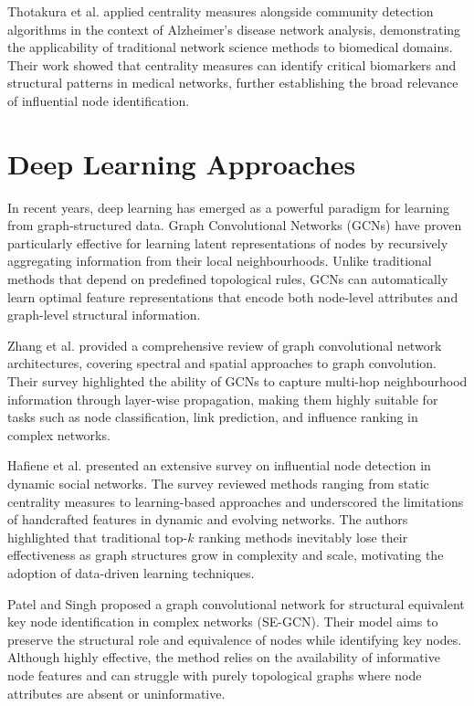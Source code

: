 Thotakura et al. \cite{thotakura2024} applied centrality measures alongside community detection algorithms in the context of Alzheimer's disease network analysis, demonstrating the applicability of traditional network science methods to biomedical domains. Their work showed that centrality measures can identify critical biomarkers and structural patterns in medical networks, further establishing the broad relevance of influential node identification.

\section{Deep Learning Approaches}

In recent years, deep learning has emerged as a powerful paradigm for learning from graph-structured data. Graph Convolutional Networks (GCNs) \cite{zhang2019gcn} have proven particularly effective for learning latent representations of nodes by recursively aggregating information from their local neighbourhoods. Unlike traditional methods that depend on predefined topological rules, GCNs can automatically learn optimal feature representations that encode both node-level attributes and graph-level structural information.

Zhang et al. \cite{zhang2019gcn} provided a comprehensive review of graph convolutional network architectures, covering spectral and spatial approaches to graph convolution. Their survey highlighted the ability of GCNs to capture multi-hop neighbourhood information through layer-wise propagation, making them highly suitable for tasks such as node classification, link prediction, and influence ranking in complex networks.

Hafiene et al. \cite{hafiene2020} presented an extensive survey on influential node detection in dynamic social networks. The survey reviewed methods ranging from static centrality measures to learning-based approaches and underscored the limitations of handcrafted features in dynamic and evolving networks. The authors highlighted that traditional top-$k$ ranking methods inevitably lose their effectiveness as graph structures grow in complexity and scale, motivating the adoption of data-driven learning techniques.

Patel and Singh \cite{patel2025} proposed a graph convolutional network for structural equivalent key node identification in complex networks (SE-GCN). Their model aims to preserve the structural role and equivalence of nodes while identifying key nodes. Although highly effective, the method relies on the availability of informative node features and can struggle with purely topological graphs where node attributes are absent or uninformative.

